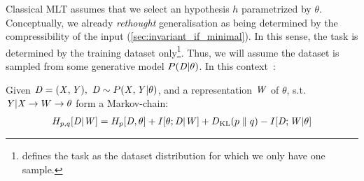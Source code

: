 Classical \ac{MLT} assumes that we select an hypothesis $h$ parametrized by $\theta$. Conceptually, we already \emph{rethought} generalisation as being determined by the compressibility of the input (\cref{sec:invariant_if_minimal}). In this sense, the task is determined by the training dataset only\footnote{ defines the task as the dataset distribution for which we only have one sample.}. Thus, we will assume the dataset is sampled from some generative model $P({\mathit{D}}|\theta)$. In this context~\cite{achille:2017emergence}:
\begin{theorem}
  Given ${\mathit{D}}=({\mathit{X}},{\mathit{Y}}),~ {\mathit{D}} \sim P({\mathit{X}}, {\mathit{Y}}| \theta)$, and a representation ${\mathit{W}}$ of $\theta$, s.t. ${\mathit{Y}}|{\mathit{X}} \to W \to \theta$ form a Markov-chain:
  \begin{align*}
    H_{p,q}[{\mathit{D}}|{\mathit{W}}]=H_p[{\mathit{D}},\theta] + I[\theta;{\mathit{D}}|{\mathit{W}}] +
    D_{\mathrm{KL}}(p \parallel q)-I[{\mathit{D}};{\mathit{W}}|\theta]
  \end{align*}
\end{theorem}
